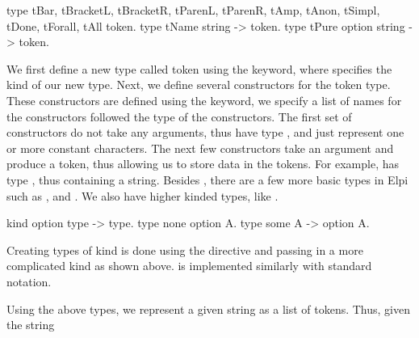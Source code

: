 \documentclass[thesis.tex]{subfiles}
\begin{document}
{\begin{elpicode}
  type tBar, tBracketL, tBracketR, tParenL, tParenR,
       tAmp, tAnon, tSimpl, tDone, tForall, tAll token.
  type tName string -> token.
  type tPure option string -> token.
\end{elpicode}
We first define a new type called token using the  keyword, where  specifies the kind of our new type. Next, we define several constructors for the token type. These constructors are defined using the  keyword, we specify a list of names for the constructors followed the type of the constructors. The first set of constructors do not take any arguments, thus have type , and just represent one or more constant characters. The next few constructors take an argument and produce a token, thus allowing us to store data in the tokens. For example,  has type , thus containing a string. Besides , there are a few more basic types in Elpi such as ,  and . We also have higher kinded types, like .
\begin{elpicode}
  kind option type -> type.
  type none option A.
  type some A -> option A.
\end{elpicode}
Creating types of kind  is done using the  directive and passing in a more complicated kind as shown above.  is implemented similarly with standard notation.

Using the above types, we represent a given string as a list of tokens. Thus, given the string \elpii{"[H %
\begin{center}
  \elpii{[tBracketL, tName "H", tPure (some "H'"), tBracketR]}
\end{center}

}}
\end{document}
